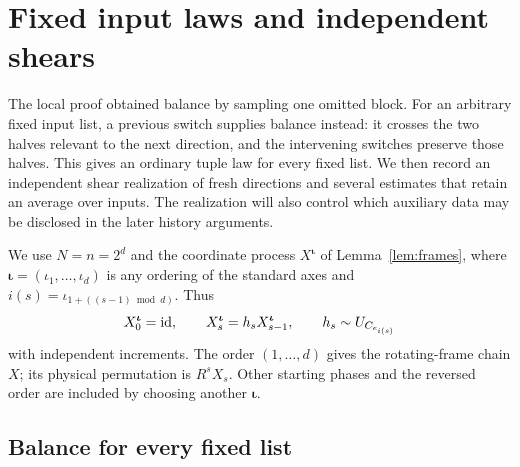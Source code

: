 \section{Fixed input laws and independent shears}
\label{shear:sec:directions}

The local proof obtained balance by sampling one omitted block.
For an arbitrary fixed input list, a previous switch supplies
balance instead: it crosses the two halves relevant to the next
direction, and the intervening switches preserve those halves.
This gives an ordinary tuple law for every fixed list. We then
record an independent shear realization of fresh directions
and several estimates that retain an average over inputs.
The realization will also control which auxiliary data may be
disclosed in the later history arguments.

We use $N=n=2^d$ and the coordinate process
$X^{\boldsymbol\iota}$ of Lemma~\ref{lem:frames}, where
$\boldsymbol\iota=(\iota_1,\ldots,\iota_d)$ is any ordering of
the standard axes and $i(s)=\iota_{1+((s-1)\bmod d)}$. Thus
\begin{equation}\label{shear:eq:coordinate-chain}
 X^{\boldsymbol\iota}_0=\mathrm{id},\qquad
 X^{\boldsymbol\iota}_s=h_sX^{\boldsymbol\iota}_{s-1},\qquad
 h_s\sim U_{C_{e_{i(s)}}}
\end{equation}
with independent increments. The order $(1,\ldots,d)$ gives the
rotating-frame chain $X$; its physical permutation is $R^sX_s$.
Other starting phases and the reversed order are included by
choosing another $\boldsymbol\iota$.

\subsection{Balance for every fixed list}

